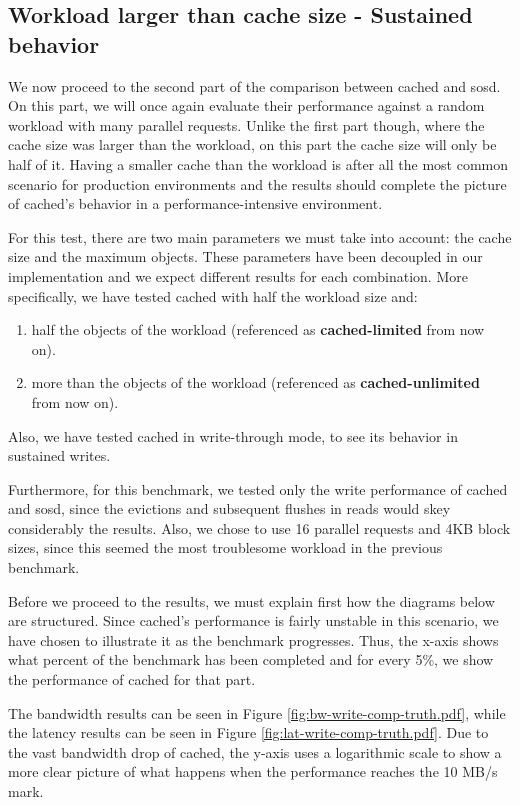 \subsection{Workload larger than cache size - Sustained behavior}
\label{sec:sustained-plot}

We now proceed to the second part of the comparison between cached and sosd.  
On this part, we will once again evaluate their performance against a random 
workload with many parallel requests. Unlike the first part though, where the 
cache size was larger than the workload, on this part the cache size will
only be half of it. Having a smaller cache than the workload is after all the 
most common scenario for production environments and the results should 
complete the picture of cached's behavior in a performance-intensive 
environment.

For this test, there are two main parameters we must take into account: the 
cache size and the maximum objects. These parameters have been decoupled in our 
implementation and we expect different results for each combination. More 
specifically, we have tested cached with half the workload size and:

\begin{enumerate}
	\item half the objects of the workload (referenced as 
		\textbf{cached-limited} from now on).
	\item more than the objects of the workload (referenced as 
		\textbf{cached-unlimited} from now on).
\end{enumerate}

Also, we have tested cached in write-through mode, to see its behavior in 
sustained writes.

Furthermore, for this benchmark, we tested only the write performance of cached 
and sosd, since the evictions and subsequent flushes in reads would skey 
considerably the results.  Also, we chose to use 16 parallel requests and 4KB 
block sizes, since this seemed the most troublesome workload in the previous 
benchmark.

Before we proceed to the results, we must explain first how the diagrams below 
are structured. Since cached's performance is fairly unstable in this scenario, 
we have chosen to illustrate it as the benchmark progresses.  Thus, the x-axis 
shows what percent of the benchmark has been completed and for every 5\%, we 
show the performance of cached for that part.

The bandwidth results can be seen in Figure \ref{fig:bw-write-comp-truth.pdf}, 
while the latency results can be seen in Figure 
\ref{fig:lat-write-comp-truth.pdf}.  Due to the vast bandwidth drop of cached, 
the y-axis uses a logarithmic scale to show a more clear picture of what 
happens when the performance reaches the 10 MB/s mark.

